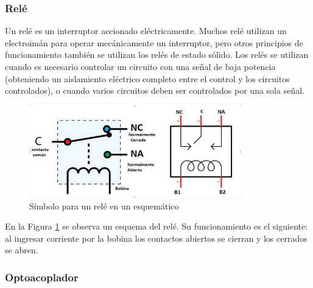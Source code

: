 \documentclass[a4paper]{article}
\begin{document}


\subsubsection*{Relé}

Un relé es un interruptor accionado eléctricamente. Muchos relé 
utilizan un electroimán para operar mecánicamente un interruptor, 
pero otros principios de funcionamiento también se utilizan los 
relés de estado sólido. Los relés se utilizan cuando es necesario 
controlar un circuito con una señal de baja potencia (obteniendo
un aislamiento eléctrico completo entre el control y los circuitos 
controlados), o cuando varios circuitos deben ser controlados por 
una sola señal.

\begin{figure}[h]\centering
    \includegraphics[height=4cm]{rele.png}
    \caption{Símbolo para un relé en un esquemático}
    \label{fig:Rele}
\end{figure}

En la Figura \ref{fig:Rele} se observa un esquema del relé. Su 
funcionamiento es el siguiente: al ingresar corriente por la bobina 
los contactos abiertos se cierran y los cerrados se abren.

\subsubsection*{Optoacoplador}
\end{document}
